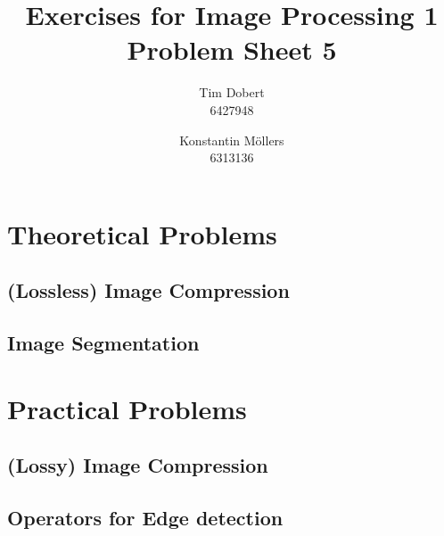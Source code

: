 \documentclass[a4paper,12pt]{article}
\title{\textbf{Exercises for Image Processing 1}\\Problem Sheet 5}
\author{Tim Dobert\\6427948 \and Konstantin M\"ollers\\6313136}
\begin{document}
	\maketitle	
	
	\section{Theoretical Problems}
	\subsection{(Lossless) Image Compression}
	\subsection{Image Segmentation}

	\section{Practical Problems}
	\subsection{(Lossy) Image Compression}
	\subsection{Operators for Edge detection}
\end{document}
